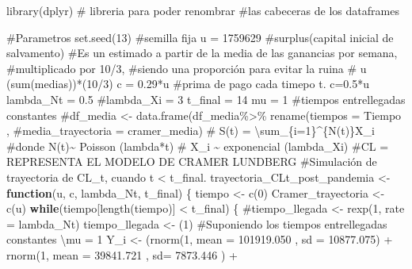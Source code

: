 \documentclass[
  us-letterpaper,
]{scrreprt}
\newenvironment{Shaded}{\begin{snugshade}}{\end{snugshade}}
\newcommand{\AttributeTok}[1]{\textcolor[rgb]{0.40,0.45,0.13}{#1}}
\newcommand{\CommentTok}[1]{\textcolor[rgb]{0.37,0.37,0.37}{#1}}
\newcommand{\ControlFlowTok}[1]{\textcolor[rgb]{0.00,0.23,0.31}{\textbf{#1}}}
\newcommand{\DecValTok}[1]{\textcolor[rgb]{0.68,0.00,0.00}{#1}}
\newcommand{\FloatTok}[1]{\textcolor[rgb]{0.68,0.00,0.00}{#1}}
\newcommand{\FunctionTok}[1]{\textcolor[rgb]{0.28,0.35,0.67}{#1}}
\newcommand{\NormalTok}[1]{\textcolor[rgb]{0.00,0.23,0.31}{#1}}
\newcommand{\OtherTok}[1]{\textcolor[rgb]{0.00,0.23,0.31}{#1}}
\newcommand{\SpecialCharTok}[1]{\textcolor[rgb]{0.37,0.37,0.37}{#1}}
\theoremstyle{plain}
\theoremstyle{plain}
\theoremstyle{definition}
\theoremstyle{remark}
\begin{document}
\begin{Shaded}
\begin{Highlighting}[]
\FunctionTok{library}\NormalTok{(dplyr) }\CommentTok{\# libreria para poder renombrar }
\CommentTok{\#las cabeceras de los dataframes}

\CommentTok{\#Parametros}
\FunctionTok{set.seed}\NormalTok{(}\DecValTok{13}\NormalTok{) }\CommentTok{\#semilla fija}
\NormalTok{u }\OtherTok{=} \DecValTok{1759629} \CommentTok{\#surplus(capital inicial de salvamento)}
\CommentTok{\#Es un estimado a partir de la media de las ganancias por semana, }
\CommentTok{\#multiplicado por 10/3, }
\CommentTok{\#siendo una proporción para evitar la ruina}
\CommentTok{\# u (sum(medias))*(10/3)}
\NormalTok{c }\OtherTok{=} \FloatTok{0.29}\SpecialCharTok{*}\NormalTok{u }\CommentTok{\#prima de pago cada timepo t. c=0.5*u}
\NormalTok{lambda\_Nt }\OtherTok{=} \FloatTok{0.5}
\CommentTok{\#lambda\_Xi = 3}
\NormalTok{t\_final }\OtherTok{=} \DecValTok{14}
\NormalTok{mu }\OtherTok{=} \DecValTok{1} \CommentTok{\#tiempos entrellegadas constantes}
\CommentTok{\#df\_media \textless{}{-} data.frame(df\_media\%\textgreater{}\% rename(tiempos = Tiempo , }
\CommentTok{\#media\_trayectoria = cramer\_media)}
\CommentTok{\# S(t) = \textbackslash{}sum\_\{i=1\}\^{}\{N(t)\}X\_i}
\CommentTok{\#donde N(t)\textasciitilde{} Poisson (lambda*t)}
\CommentTok{\# X\_i \textasciitilde{} exponencial (lambda\_Xi)}
\CommentTok{\#CL = REPRESENTA EL MODELO DE CRAMER LUNDBERG}
\CommentTok{\#Simulación de trayectoria de CL\_t, cuando t \textless{} t\_final.}
\NormalTok{trayectoria\_CLt\_post\_pandemia }\OtherTok{\textless{}{-}} \ControlFlowTok{function}\NormalTok{(u, c, lambda\_Nt, t\_final)}
\NormalTok{\{}
\NormalTok{  tiempo }\OtherTok{\textless{}{-}} \FunctionTok{c}\NormalTok{(}\DecValTok{0}\NormalTok{)}
\NormalTok{  Cramer\_trayectoria }\OtherTok{\textless{}{-}} \FunctionTok{c}\NormalTok{(u)}
  \ControlFlowTok{while}\NormalTok{(tiempo[}\FunctionTok{length}\NormalTok{(tiempo)] }\SpecialCharTok{\textless{}}\NormalTok{ t\_final)}
\NormalTok{  \{}
    \CommentTok{\#tiempo\_llegada \textless{}{-} rexp(1, rate = lambda\_Nt)}
\NormalTok{    tiempo\_llegada }\OtherTok{\textless{}{-}}\NormalTok{ (}\DecValTok{1}\NormalTok{) }
\CommentTok{\#Suponiendo los tiempos entrellegadas constantes \textbackslash{}mu = 1}
\NormalTok{    Y\_i }\OtherTok{\textless{}{-}}\NormalTok{  (}\FunctionTok{rnorm}\NormalTok{(}\DecValTok{1}\NormalTok{, }\AttributeTok{mean =} \FloatTok{101919.050}\NormalTok{ , }\AttributeTok{sd =} \FloatTok{10877.075}\NormalTok{)  }\SpecialCharTok{+}
               \FunctionTok{rnorm}\NormalTok{(}\DecValTok{1}\NormalTok{, }\AttributeTok{mean =}  \FloatTok{39841.721}\NormalTok{ , }\AttributeTok{sd=} \FloatTok{7873.446}\NormalTok{ ) }\SpecialCharTok{+} 

\end{Highlighting}
\end{Shaded}
\end{document}
